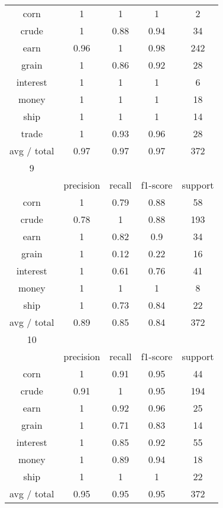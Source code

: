 \documentclass[11pt]{article}
\begin{document}
\begin{center}
\begin{longtable}{| c | c | c | c | c |}
corn        & 1         & 1      & 1        & 2       \\
crude       & 1         & 0.88   & 0.94     & 34      \\
earn        & 0.96      & 1      & 0.98     & 242     \\
grain       & 1         & 0.86   & 0.92     & 28      \\
interest    & 1         & 1      & 1        & 6       \\
money       & 1         & 1      & 1        & 18      \\
ship        & 1         & 1      & 1        & 14      \\
trade       & 1         & 0.93   & 0.96     & 28      \\

avg / total & 0.97      & 0.97   & 0.97     & 372     \\

\hline
9           &           &        &          &         \\
\hline
           & precision & recall & f1-score & support \\

corn        & 1         & 0.79   & 0.88     & 58      \\
crude       & 0.78      & 1      & 0.88     & 193     \\
earn        & 1         & 0.82   & 0.9      & 34      \\
grain       & 1         & 0.12   & 0.22     & 16      \\
interest    & 1         & 0.61   & 0.76     & 41      \\
money       & 1         & 1      & 1        & 8       \\
ship        & 1         & 0.73   & 0.84     & 22      \\

avg / total & 0.89      & 0.85   & 0.84     & 372     \\

\hline
10          &           &        &          &         \\
\hline
           & precision & recall & f1-score & support \\

corn        & 1         & 0.91   & 0.95     & 44      \\
crude       & 0.91      & 1      & 0.95     & 194     \\
earn        & 1         & 0.92   & 0.96     & 25      \\
grain       & 1         & 0.71   & 0.83     & 14      \\
interest    & 1         & 0.85   & 0.92     & 55      \\
money       & 1         & 0.89   & 0.94     & 18      \\
ship        & 1         & 1      & 1        & 22      \\

avg / total & 0.95      & 0.95   & 0.95     & 372     \\
\hline
\end{longtable}
\end{center}
\end{document}
